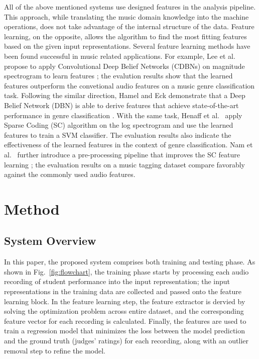 \documentclass{article}
\begin{document}
All of the above mentioned systems use designed features in the analysis pipeline. This approach, while translating the music domain knowledge into the machine operations, does not take advantage of the internal structure of the data. Feature learning, on the opposite, allows the algorithm to find the most fitting features based on the given input representations. Several feature learning methods have been found successful in music related applications. For example, Lee et al.~ propose to apply Convolutional Deep Belief Networks (CDBNs) on magnitude spectrogram to learn features \cite{Lee2009a}; the evalution results show that the learned features outperform the convetional audio features on a music genre classification task. Following the similar direction, Hamel and Eck demonstrate that a Deep Belief Network (DBN) is able to derive features that achieve state-of-the-art performance in genre classification \cite{Hamel2010}. With the same task, Henaff et al.~ apply Sparse Coding (SC) algorithm on the log spectrogram and use the learned features to train a SVM classifier. The evaluation results also indicate the effectiveness of the learned features in the context of genre classification. Nam et al.~ further introduce a pre-processing pipeline that improves the SC feature learning \cite{Nam2012}; the evaluation results on a music tagging dataset compare favorably against the commonly used audio features.   

\section{Method}\label{sec:method}
\subsection{System Overview}
In this paper, the proposed system comprises both training and testing phase. As shown in Fig.~\ref{fig:flowchart}, the training phase starts by processing each audio recording of student performance into the input representation; the input representations in the training data are collected and passed onto the feature learning block. In the feature learning step, the feature extractor is dervied by solving the optimization problem across entire dataset, and the corresponding feature vector for each recording is calculated. Finally, the features are used to train a regression model that minimizes the loss between the model prediction and the ground truth (judges' ratings) for each recording, along with an outlier removal step to refine the model. 
\end{document}
